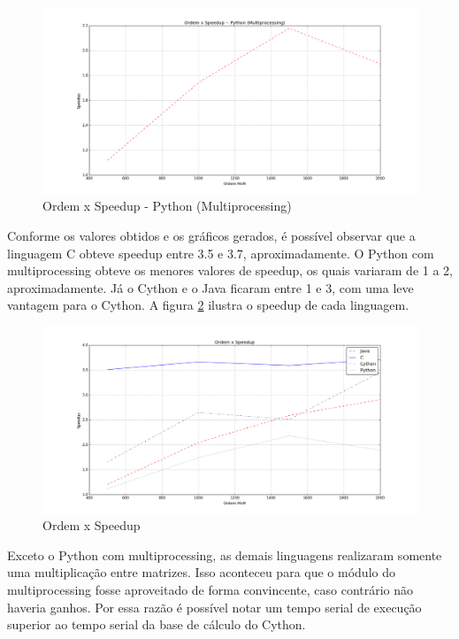 \documentclass[a4paper,12pt]{article}
\begin{document}
\begin{figure}[!htb]
  \centering
  \includegraphics[width=15.0cm]{pictures/speedup_Python.png}
  \caption{Ordem x Speedup - Python (Multiprocessing)}
\label{fig:speedup_Python}
\end{figure}


Conforme os valores obtidos e os gráficos gerados, é possível observar que a linguagem C obteve speedup entre 3.5 e 3.7, aproximadamente. O Python com multiprocessing obteve os menores valores de speedup, os quais variaram de 1 a 2, aproximadamente. Já o Cython e o Java ficaram entre 1 e 3, com uma leve vantagem para o Cython. A figura \ref{fig:speedup_full} ilustra o speedup de cada linguagem. 

\begin{figure}[!htb]
  \centering
  \includegraphics[width=15.0cm]{pictures/speedup_Full.png}
  \caption{Ordem x Speedup}
\label{fig:speedup_full}
\end{figure}

Exceto o Python com multiprocessing, as demais linguagens realizaram somente uma multiplicação entre matrizes. Isso aconteceu para que o módulo do multiprocessing fosse aproveitado de forma convincente, caso contrário não haveria ganhos. Por essa razão é possível notar um tempo serial de execução superior ao tempo serial da base de cálculo do Cython.
\end{document}
